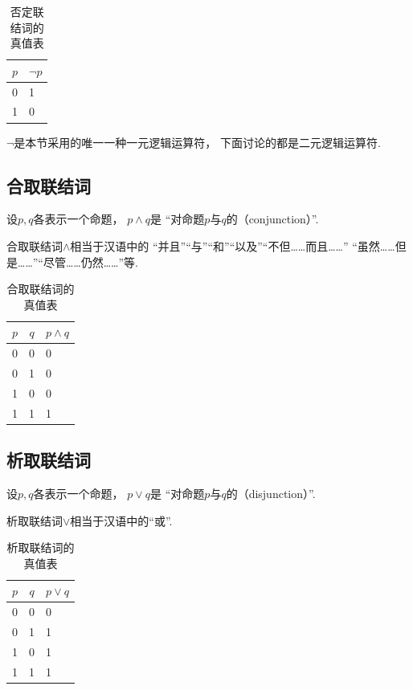 \begin{table}[ht]
	\centering
	\begin{tabular}{|c|p{1.5cm}|}
		\hline
		\(p\) & \(\neg p\) \\
		\hline
		0 & 1 \\
		1 & 0 \\
		\hline
	\end{tabular}
	\caption{否定联结词的真值表}
\end{table}

\(\neg\)是本节采用的唯一一种一元逻辑运算符，
下面讨论的都是二元逻辑运算符.

\subsection{合取联结词}
设\(p,q\)各表示一个命题，
\(p \land q\)是
“对命题\(p\)与\(q\)的（conjunction）”.

合取联结词\(\land\)相当于汉语中的
“并且”“与”“和”“以及”“不但……而且……”
“虽然……但是……”“尽管……仍然……”等.

\begin{table}[ht]
	\centering
	\begin{tabular}{|*{2}{c|}p{2cm}|}
		\hline
		\(p\) & \(q\) & \(p \land q\) \\
		\hline
		0 & 0 & 0 \\
		0 & 1 & 0 \\
		1 & 0 & 0 \\
		1 & 1 & 1 \\
		\hline
	\end{tabular}
	\caption{合取联结词的真值表}
\end{table}

\subsection{析取联结词}
设\(p,q\)各表示一个命题，
\(p \lor q\)是
“对命题\(p\)与\(q\)的（disjunction）”.

析取联结词\(\lor\)相当于汉语中的“或”.

\begin{table}[ht]
	\centering
	\begin{tabular}{|*{2}{c|}p{2cm}|}
		\hline
		\(p\) & \(q\) & \(p \lor q\) \\
		\hline
		0 & 0 & 0 \\
		0 & 1 & 1 \\
		1 & 0 & 1 \\
		1 & 1 & 1 \\
		\hline
	\end{tabular}
	\caption{析取联结词的真值表}
\end{table}

